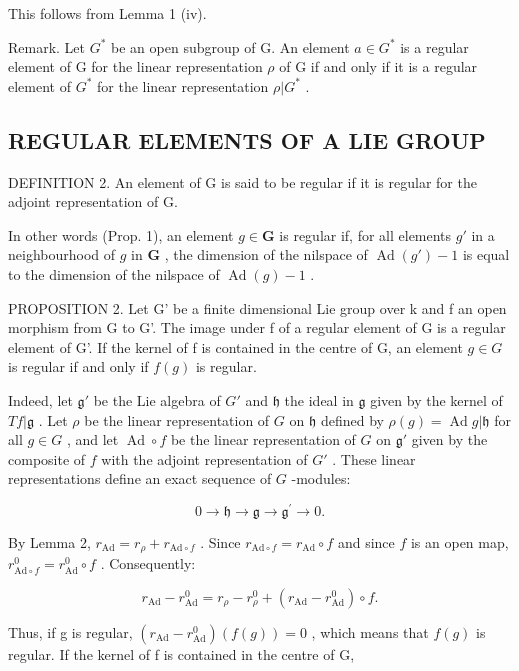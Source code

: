 This follows from Lemma 1 (iv).

Remark. Let \(G^{*}\) be an open subgroup of G. An element \(a \in G^{*}\) is a regular element of G for the linear representation \(\rho\) of G if and only if it is a regular element of \(G^{*}\) for the linear representation \(\rho|G^{*}\) .

\subsection{REGULAR ELEMENTS OF A LIE GROUP}

DEFINITION 2. An element of G is said to be regular if it is regular for the adjoint representation of G.

In other words (Prop. 1), an element \(g \in \mathbf{G}\) is regular if, for all elements \(g'\) in a neighbourhood of \(g\) in \(\mathbf{G}\) , the dimension of the nilspace of \(\operatorname{Ad}(g') - 1\) is equal to the dimension of the nilspace of \(\operatorname{Ad}(g) - 1\) .

PROPOSITION 2. Let G' be a finite dimensional Lie group over k and f an open morphism from G to G'. The image under f of a regular element of G is a regular element of G'. If the kernel of f is contained in the centre of G, an element \(g \in G\) is regular if and only if \(f(g)\) is regular.

Indeed, let \(\mathfrak{g}'\) be the Lie algebra of \(G'\) and \(\mathfrak{h}\) the ideal in \(\mathfrak{g}\) given by the kernel of \(Tf|\mathfrak{g}\) . Let \(\rho\) be the linear representation of \(G\) on \(\mathfrak{h}\) defined by \(\rho(g) = \operatorname{Ad} g|\mathfrak{h}\) for all \(g \in G\) , and let \(\operatorname{Ad} \circ f\) be the linear representation of \(G\) on \(\mathfrak{g}'\) given by the composite of \(f\) with the adjoint representation of \(G'\) . These linear representations define an exact sequence of \(G\) -modules:

\[
0 \to \mathfrak {h} \to \mathfrak {g} \to \mathfrak {g} ^ {\prime} \to 0.
\]

By Lemma 2, \(r_{\mathrm{Ad}} = r_{\rho} + r_{\mathrm{Ad}\circ f}\) . Since \(r_{\mathrm{Ad}\circ f} = r_{\mathrm{Ad}}\circ f\) and since \(f\) is an open map, \(r_{\mathrm{Ad}\circ f}^{0} = r_{\mathrm{Ad}}^{0}\circ f\) . Consequently:

\[
r _ {\mathrm{Ad}} - r _ {\mathrm{Ad}} ^ {0} = r _ {\rho} - r _ {\rho} ^ {0} + \left(r _ {\mathrm{Ad}} - r _ {\mathrm{Ad}} ^ {0}\right) \circ f.
\]

Thus, if g is regular, \((r_{\mathrm{Ad}} - r_{\mathrm{Ad}}^{0})(f(g)) = 0\) , which means that \(f(g)\) is regular. If the kernel of f is contained in the centre of G,

